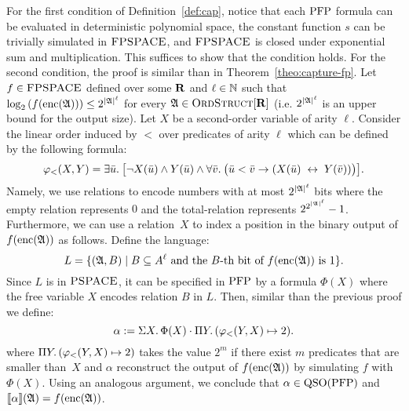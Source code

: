 For the first condition of Definition~\ref{def:cap}, notice that each ${\rm PFP}$ formula can be evaluated in deterministic polynomial space, the constant function $s$ can be trivially simulated in $\text{\sc FPSPACE}$, and $\text{\sc FPSPACE}$ is closed under exponential sum and multiplication. This suffices to show that the condition holds.
For the second condition, the proof is similar than in Theorem~\ref{theo:capture-fp}. Let $f\in \text{\sc FPSPACE}$ defined over some $\mathbf{R}$ and $\ell\in\mathbb{N}$ such that $\log_2\left( f({\rm enc}(\mathfrak{A})) \right) \leq 2^{{|\mathfrak{A}|}^\ell}$ for every $\mathfrak{A}\in\text{\sc OrdStruct}[\mathbf{R}]$  (i.e. $2^{{|\mathfrak{A}|}^\ell}$ is an upper bound for the output size). Let $X$ be a second-order variable of arity $\ell$. Consider the linear order induced by $<$ over predicates of arity $\ell$ which can be defined by the following formula:
$$
\varphi_{<}(X,Y) = \exists{\bar{u}}.\:\big[\neg X(\bar{u})\wedge Y(\bar{u})\wedge \forall{\bar{v}}.\:\big(
\bar{u}<\bar{v}\to(X(\bar{u})\;\leftrightarrow\; Y(\bar{v}))\big)\big].
$$
Namely, we use relations to encode numbers with at most $2^{{|\mathfrak{A}|}^\ell}$ bits where the empty relation represents $0$ and the total-relation represents $2^{2^{{|\mathfrak{A}|}^\ell}}-1$.
Furthermore, we can use a relation~$X$ to index a position in the binary output of $f({\rm enc}(\mathfrak{A}))$ as follows.
Define the language:
\[
L = \{(\mathfrak{A},B)\mid B \subseteq A^{\ell}\text{ and the $B$-th bit of $f({\rm enc}(\mathfrak{A}))$ is 1}\}.
\]
Since $L$ is in $\text{\sc PSPACE}$, it can be specified in ${\rm PFP}$ \cite{AbiteboulV89} by a formula $\Phi(X)$ where the free variable $X$ encodes relation $B$ in $L$. Then, similar than the previous proof we define:
$$
\alpha := \Sigma{X}.\, \Phi(X)\cdot  \Pi{Y}.\,(\varphi_{<}(Y,X)\mapsto 2).
$$ 
where $\Pi{Y}.\,(\varphi_{<}(Y,X)\mapsto 2)$ takes the value $2^m$ if there exist $m$ predicates that are smaller than~$X$ and $\alpha$ reconstruct the output of $f({\rm enc}(\mathfrak{A}))$ by simulating $f$ with $\Phi(X)$. Using an analogous argument, we conclude that $\alpha\in{\rm QSO}({\rm PFP})$ and ${\llbracket{}{\alpha}\rrbracket}(\mathfrak{A}) = f({\rm enc}(\mathfrak{A}))$.